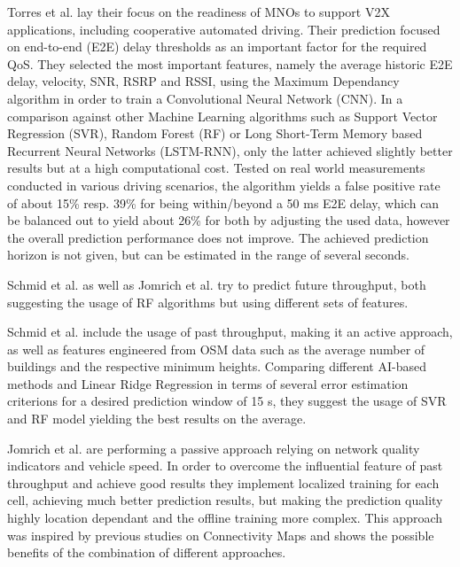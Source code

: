 \documentclass[conference]{IEEEtran}
\begin{document}
Torres et al. \cite{torres-figueroaQoSEvaluationPrediction2020} lay their focus on the readiness of MNOs to support V2X applications, including cooperative automated driving. Their prediction focused on end-to-end (E2E) delay thresholds as an important factor for the required QoS. They selected the most important features, namely the average historic E2E delay, velocity, SNR, RSRP and RSSI, using the Maximum Dependancy algorithm in order to train a Convolutional Neural Network (CNN). In a comparison against other Machine Learning algorithms such as Support Vector Regression (SVR), Random Forest (RF) or Long Short-Term Memory based Recurrent Neural Networks (LSTM-RNN), only the latter achieved slightly better results but at a high computational cost. Tested on real world measurements conducted in various driving scenarios, the algorithm yields a false positive rate of about 15\% resp. 39\% for being within/beyond a 50 ms E2E delay, which can be balanced out to yield about 26\% for both by adjusting the used data, however the overall prediction performance does not improve. The achieved prediction horizon is not given, but can be estimated in the range of several seconds.

Schmid et al. \cite{schmidDeepLearningApproach2019, schmidComparisonAIBasedThroughput2019} as well as Jomrich et al. \cite{jomrichEnhancedCellularBandwidth2019} try to predict future throughput, both suggesting the usage of RF algorithms but using different sets of features.

Schmid et al. include the usage of past throughput, making it an active approach, as well as features engineered from OSM data such as the average number of buildings and the respective minimum heights. Comparing different AI-based methods and Linear Ridge Regression in terms of several error estimation criterions for a desired prediction window of 15 s, they suggest the usage of SVR and RF model yielding the best results on the average.

Jomrich et al. are performing a passive approach relying on network quality indicators and vehicle speed. In order to overcome the influential feature of past throughput and achieve good results they implement localized training for each cell, achieving much better prediction results, but making the prediction quality highly location dependant and the offline training more complex. This approach was inspired by previous studies on Connectivity Maps and shows the possible benefits of the combination of different approaches.
\end{document}
